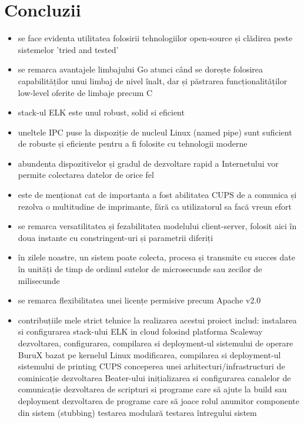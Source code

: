 \documentclass[a4paper, 12pt, twoside]{report}
\begin{document}
{\chapter{Concluzii}
\begin{itemize}
	\item se face evidenta utilitatea folosirii tehnologiilor open-source și clădirea peste sistemelor 'tried and tested'
	\item se remarca avantajele limbajului Go atunci când se dorește folosirea capabilităților unui limbaj de nivel înalt, dar și păstrarea funcționalităților low-level oferite de limbaje precum C
	\item stack-ul ELK este unul robust, solid si eficient
	\item uneltele IPC puse la dispoziție de nucleul Linux (named pipe) sunt suficient de robuste și eficiente pentru a fi folosite cu tehnologii moderne
	\item abundenta dispozitivelor și gradul de dezvoltare rapid a Internetului vor permite colectarea datelor de orice fel
	\item este de menționat cat de importanta a fost abilitatea CUPS de a comunica și rezolva o multitudine de imprimante, fără ca utilizatorul sa facă vreun efort
	\item se remarca versatilitatea și fezabilitatea modelului client-server, folosit aici în doua instante cu constringent-uri și parametrii diferiți
	\item în zilele noastre, un sistem poate colecta, procesa și transmite cu succes date în unități de timp de ordinul sutelor de microsecunde sau zecilor de milisecunde
	\item se remarca flexibilitatea unei licențe permisive precum Apache v2.0
	\item contribuțiile mele strict tehnice la realizarea acestui proiect includ:
		\subitem instalarea si configurarea stack-ului ELK in cloud folosind platforma Scaleway
		\subitem dezvoltarea, configurarea, compilarea si deployment-ul sistemului de operare BuruX bazat pe kernelul Linux
		\subitem modificarea, compilarea si deployment-ul sistemului de printing CUPS
		\subitem conceperea unei arhitecturi/infrastructuri de cominicație
		\subitem dezvoltarea Beater-ului
		\subitem inițializarea si configurarea canalelor de comunicație
		\subitem dezvoltarea de scripturi si programe care să ajute la build sau deployment
		\subitem dezvoltarea de programe care să joace rolul anumitor componente din sistem (stubbing)
		\subitem testarea modulară
		\subitem testarea întregului sistem

\end{itemize}}
\end{document}
